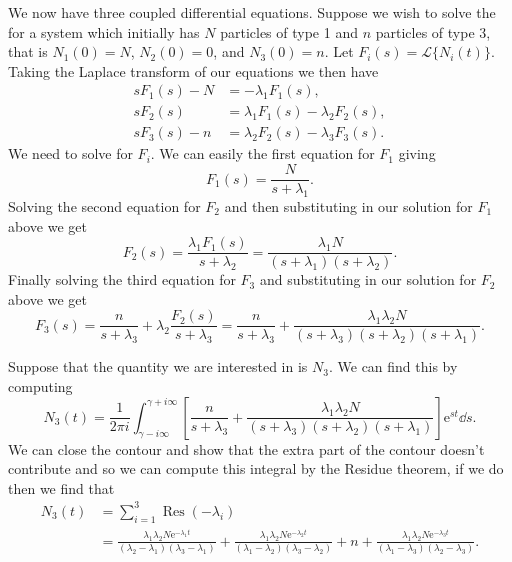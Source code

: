\documentclass[fleqn]{NotesClass}
\newcommand*{\e}{\mathrm{e}}
\DeclareMathOperator{\Res}{Res}
\newcommand*{\laplaceTransform}{\mathcal{L}}
\begin{document}
    We now have three coupled differential equations.
    Suppose we wish to solve the for a system which initially has \(N\) particles of type 1 and \(n\) particles of type 3, that is \(N_1(0) = N\), \(N_2(0) = 0\), and \(N_3(0) = n\).
    Let \(F_i(s) = \laplaceTransform\{N_i(t)\}\).
    Taking the Laplace transform of our equations we then have
    \begin{align}
        sF_1(s) - N &= -\lambda_1F_1(s),\\
        sF_2(s) &= \lambda_1F_1(s) - \lambda_2F_2(s),\\
        sF_3(s) - n &= \lambda_2F_2(s) - \lambda_3F_3(s).
    \end{align}
    We need to solve for \(F_i\).
    We can easily the first equation for \(F_1\) giving
    \begin{equation}
        F_1(s) = \frac{N}{s + \lambda_1}.
    \end{equation}
    Solving the second equation for \(F_2\) and then substituting in our solution for \(F_1\) above we get
    \begin{equation}
        F_2(s) = \frac{\lambda_1F_1(s)}{s + \lambda_2} = \frac{\lambda_1N}{(s + \lambda_1)(s + \lambda_2)}.
    \end{equation}
    Finally solving the third equation for \(F_3\) and substituting in our solution for \(F_2\) above we get
    \begin{equation}
        F_3(s) = \frac{n}{s + \lambda_3} + \lambda_2\frac{F_2(s)}{s + \lambda_3} = \frac{n}{s + \lambda_3} + \frac{\lambda_1\lambda_2N}{(s + \lambda_3)(s + \lambda_2)(s + \lambda_1)}.
    \end{equation}
    
    Suppose that the quantity we are interested in is \(N_3\).
    We can find this by computing
    \begin{equation}
        N_3(t) = \frac{1}{2\pi i} \int_{\gamma - i\infty}^{\gamma + i\infty} \left[ \frac{n}{s + \lambda_3} + \frac{\lambda_1\lambda_2N}{(s + \lambda_3)(s + \lambda_2)(s + \lambda_1)} \right] \e^{st} \dd{s}.
    \end{equation}
    We can close the contour and show that the extra part of the contour doesn't contribute and so we can compute this integral by the Residue theorem, if we do then we find that
    \begin{align}
        N_3(t) &= \sum_{i = 1}^{3} \Res(-\lambda_i)\\
        &= \frac{\lambda_1\lambda_2N\e^{-\lambda_1t}}{(\lambda_2 - \lambda_1)(\lambda_3 - \lambda_1)} + \frac{\lambda_1\lambda_2N\e^{-\lambda_2t}}{(\lambda_1 - \lambda_2)(\lambda_3 - \lambda_2)} + n + \frac{\lambda_1\lambda_2N\e^{-\lambda_3t}}{(\lambda_1 - \lambda_3)(\lambda_2 - \lambda_3)}.
    \end{align}
    
\end{document}
